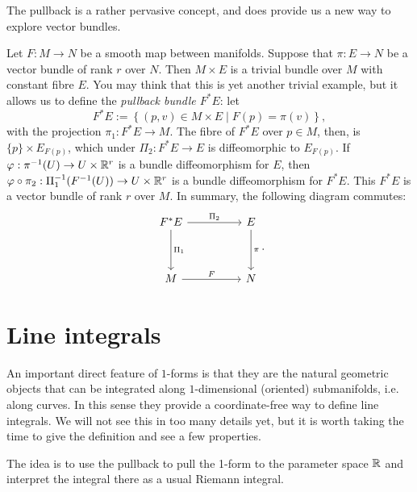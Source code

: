 The pullback is a rather pervasive concept, and does provide us a new way to explore vector bundles.

\begin{example}
  Let $F:M\to N$ be a smooth map between manifolds. Suppose that $\pi: E \to N$ be a vector bundle of rank $r$ over $N$.
  Then $M\times E$ is a trivial bundle over $M$ with constant fibre $E$.
  You may think that this is yet another trivial example, but it allows us to define the \emph{pullback bundle $F^* E$}: let
  \begin{equation}
    F^* E := \left\lbrace (p, v) \in M\times E \mid F(p) = \pi(v)\right\rbrace,
  \end{equation}
  with the projection $\pi_1:F^* E \to M$.
  The fibre of $F^*E$ over $p\in M$, then, is $\{p\}\times E_{F(p)}$, which under $\Pi_2:F^* E \to E$ is diffeomorphic to $E_{F(p)}$.
  If $\varphi : \pi^{-1}(U) \to U\times\mathbb{R}^r$ is a bundle diffeomorphism for $E$, then $\varphi\circ\pi_2: \Pi_1^{-1}(F^{-1}(U)) \to U\times\mathbb{R}^r$ is a bundle diffeomorphism for $F^*E$.
  This $F^*E$ is a vector bundle of rank $r$ over $M$. 
  In summary, the following diagram commutes:
  \begin{equation}
    \begin{tikzcd}[row sep=huge, column sep=huge]
      F^* E \arrow[r, "\Pi_2"] \arrow[d, "\Pi_1"]
      & E \arrow[d, "\pi"] \\
      M \arrow[r, "F"]
      & N
    \end{tikzcd}.
  \end{equation}
\end{example}

\section{Line integrals}

An important direct feature of $1$-forms is that they are the natural geometric objects that can be integrated along $1$-dimensional (oriented) submanifolds, i.e. along curves.
In this sense they provide a coordinate-free way to define line integrals.
We will not see this in too many details yet, but it is worth taking the time to give the definition and see a few properties.

The idea is to use the pullback to pull the 1-form to the parameter space $\mathbb{R}$ and interpret the integral there as a usual Riemann integral.


